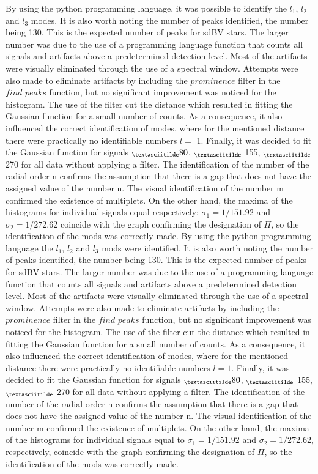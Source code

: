 \documentclass{aa}
\begin{document}
By using the python programming language, it was possible to identify the $ l_1 $, $ l_2 $ and $ l_3 $ modes. It is also worth noting the number of peaks identified, the number being 130. This is the expected number of peaks for sdBV stars. The larger number was due to the use of a programming language function that counts all signals and artifacts above a predetermined detection level. Most of the artifacts were visually eliminated through the use of a spectral window. Attempts were also made to eliminate artifacts by including the $ \textit{prominence} $ filter in the $ \textit{find peaks} $ function, but no significant improvement was noticed for the histogram. The use of the filter cut the distance which resulted in fitting the Gaussian function for a small number of counts. As a consequence, it also influenced the correct identification of modes, where for the mentioned distance there were practically no identifiable numbers $ l = $ 1. Finally, it was decided to fit the Gaussian function for signals $ _{\textasciitilde} 80 $, $ _{\textasciitilde} $ 155, $ _{\textasciitilde} $ 270 for all data without applying a filter. The identification of the number of the radial order n confirms the assumption that there is a gap that does not have the assigned value of the number n. The visual identification of the number m confirmed the existence of multiplets. On the other hand, the maxima of the histograms for individual signals equal respectively: $ \sigma_1 = 1 / 151.92 $ and $ \sigma_2 = 1 / 272.62 $ coincide with the graph confirming the designation of $ \Pi $, so the identification of the mods was correctly made. By using the python programming language the $ l_1 $, $ l_2 $ and $ l_3 $ mods were identified. It is also worth noting the number of peaks identified, the number being 130. This is the expected number of peaks for sdBV stars. The larger number was due to the use of a programming language function that counts all signals and artifacts above a predetermined detection level. Most of the artifacts were visually eliminated through the use of a spectral window. Attempts were also made to eliminate artifacts by including the $ \textit{prominence} $ filter in the $ \textit{find peaks} $ function, but no significant improvement was noticed for the histogram. The use of the filter cut the distance which resulted in fitting the Gaussian function for a small number of counts. As a consequence, it also influenced the correct identification of modes, where for the mentioned distance there were practically no identifiable numbers $ l = 1$. Finally, it was decided to fit the Gaussian function for signals $ _{\textasciitilde} 80 $, $ _{\textasciitilde} $ 155, $ _{\textasciitilde} $ 270 for all data without applying a filter. The identification of the number of the radial order n confirms the assumption that there is a gap that does not have the assigned value of the number n. The visual identification of the number m confirmed the existence of multiplets. On the other hand, the maxima of the histograms for individual signals equal to $ \sigma_1 = 1 / 151.92 $ and $ \sigma_2 = 1 / 272.62 $, respectively, coincide with the graph confirming the designation of $ \Pi $, so the identification of the mods was correctly made.
\end{document}

